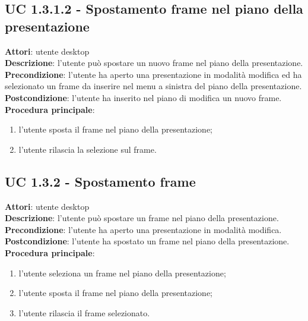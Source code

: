 \subsection{UC 1.3.1.2 - Spostamento frame nel piano della presentazione}{
	\label{uc1.3.1.2}
	\textbf{Attori}: utente desktop \\
	\textbf{Descrizione}: l'utente può spostare un nuovo frame nel piano della presentazione. \\
	\textbf{Precondizione}: l'utente ha aperto una presentazione in modalità modifica ed ha selezionato un frame da inserire nel menu a sinistra del piano della presentazione.	\\
	\textbf{Postcondizione}: l'utente ha inserito nel piano di modifica un nuovo frame.	\\
	\textbf{Procedura principale}:
	\begin{enumerate}
		\item l'utente sposta il frame nel piano della presentazione;
		\item l'utente rilascia la selezione sul frame.
	\end{enumerate}
	}
\subsection{UC 1.3.2 - Spostamento frame}{
	\label{uc1.3.2}
	\textbf{Attori}: utente desktop \\
	\textbf{Descrizione}: l'utente può spostare un frame nel piano della presentazione. \\
	\textbf{Precondizione}: l'utente ha aperto una presentazione in modalità modifica.	\\
	\textbf{Postcondizione}: l'utente ha spostato un frame nel piano della presentazione.	\\
	\textbf{Procedura principale}:
	\begin{enumerate}
		\item l'utente seleziona un frame nel piano della presentazione;
		\item l'utente sposta il frame nel piano della presentazione;
		\item l'utente rilascia il frame selezionato.
	\end{enumerate}
	}
